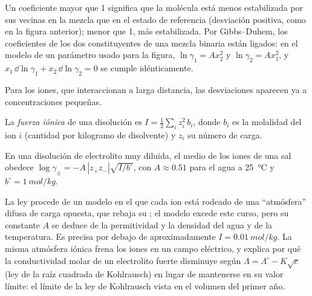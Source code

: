 Un coeficiente mayor que 1 significa que la molécula está menos estabilizada por sus
vecinas en la mezcla que en el estado de referencia (desviación positiva, como en la figura
anterior); menor que 1, más estabilizada. Por Gibbs--Duhem, los coeficientes de los dos
constituyentes de una mezcla binaria están ligados: en el modelo de un parámetro
usado para la figura, $\ln\gamma_1 = Ax_2^2$ y $\ln\gamma_2 = Ax_1^2$, y
$x_1\,\dd\ln\gamma_1 + x_2\,\dd\ln\gamma_2 = 0$ se cumple idénticamente.

Para los iones, que interaccionan a larga distancia, las desviaciones aparecen ya a
concentraciones pequeñas.

\begin{definition}\label{def:b2:chemical-potential:ionic-strength}
La \emph{fuerza iónica} de una disolución es $I =
\frac12\sum_i z_i^2\,b_i$, donde $b_i$ es la molalidad del ion $i$ (cantidad por
kilogramo de disolvente) y $z_i$ su número de carga.
\end{definition}

\begin{proposition}\label{prop:b2:chemical-potential:debye-huckel}
En una disolución de electrolito muy diluida, el  medio de los
iones de una sal obedece $\log\gamma_\pm = -A\,|z_+z_-|\sqrt{I/b^\circ}$, con $A
\approx 0.51$ para el agua a \qty{25}{\celsius} y $b^\circ =
\qty{1}{mol/kg}$.
\end{proposition}
\admitted

\begin{remark}\label{rem:b2:chemical-potential:dh-range}
La ley procede de un modelo en el que cada ion está rodeado de una ``atmósfera''
difusa de carga opuesta, que rebaja su ; el
modelo excede este curso, pero su constante $A$ se deduce de la
permitividad y la densidad del agua y de la temperatura. Es precisa por debajo
de aproximadamente $I = \qty{0.01}{mol/kg}$. La misma atmósfera iónica frena los iones en
un campo eléctrico, y explica por qué la conductividad molar de un electrolito
fuerte disminuye según $\Lambda = \Lambda^\circ - K\sqrt c$ (ley de la raíz cuadrada de
Kohlrausch) en lugar de mantenerse en su valor límite: el límite de la
ley de Kohlrausch vista en el volumen del primer año.
\end{remark}


